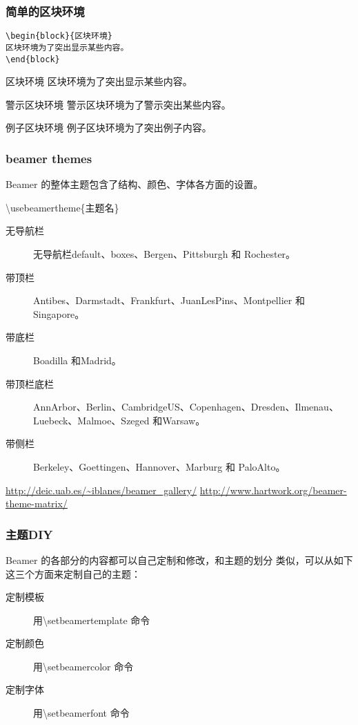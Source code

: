 \begin{frame}[fragile]\frametitle{简单的区块环境}
\begin{block}{}
    \begin{verbatim}
\begin{block}{区块环境}
区块环境为了突出显示某些内容。
\end{block}
    \end{verbatim}
\end{block}
\begin{block}{区块环境}
区块环境为了突出显示某些内容。
\end{block}
\begin{alertblock}{警示区块环境}
警示区块环境为了警示突出某些内容。
\end{alertblock}
\begin{exampleblock}{例子区块环境}
例子区块环境为了突出例子内容。
\end{exampleblock}
\end{frame}

\begin{frame}\frametitle{beamer themes}
Beamer 的整体主题包含了结构、颜色、字体各方面的设置。
\begin{block}{}
\textbackslash usebeamertheme\{主题名\}
\end{block}
\begin{description}
    \item[无导航栏] 无导航栏default、boxes、Bergen、Pittsburgh 和 Rochester。
    \item[带顶栏] Antibes、Darmstadt、Frankfurt、JuanLesPins、Montpellier 和Singapore。
    \item[带底栏] Boadilla 和Madrid。
    \item[带顶栏底栏] AnnArbor、Berlin、CambridgeUS、Copenhagen、Dresden、Ilmenau、Luebeck、Malmoe、Szeged 和Warsaw。
    \item[带侧栏] Berkeley、Goettingen、Hannover、Marburg 和 PaloAlto。
\end{description}

\begin{center}
    \footnotesize{\url{http://deic.uab.es/~iblanes/beamer_gallery/}}
    \footnotesize{\url{http://www.hartwork.org/beamer-theme-matrix/}}
\end{center}
\end{frame}

\begin{frame}\frametitle{主题DIY}
Beamer 的各部分的内容都可以自己定制和修改，和主题的划分
类似，可以从如下这三个方面来定制自己的主题：

\begin{description}
    \item[定制模板] 用\textbackslash setbeamertemplate 命令
    \item[定制颜色] 用\textbackslash setbeamercolor 命令
    \item[定制字体] 用\textbackslash setbeamerfont 命令
\end{description}
\end{frame}
